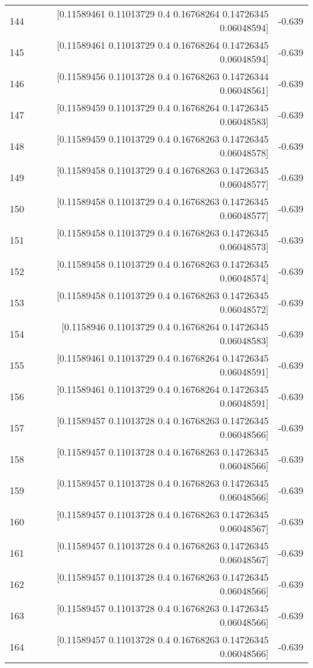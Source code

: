 \begin{longtable}{lrr}
144 & [0.11589461 0.11013729 0.4        0.16768264 0.14726345 0.06048594] & -0.639 \\
145 & [0.11589461 0.11013729 0.4        0.16768264 0.14726345 0.06048594] & -0.639 \\
146 & [0.11589456 0.11013728 0.4        0.16768263 0.14726344 0.06048561] & -0.639 \\
147 & [0.11589459 0.11013729 0.4        0.16768264 0.14726345 0.06048583] & -0.639 \\
148 & [0.11589459 0.11013729 0.4        0.16768263 0.14726345 0.06048578] & -0.639 \\
149 & [0.11589458 0.11013729 0.4        0.16768263 0.14726345 0.06048577] & -0.639 \\
150 & [0.11589458 0.11013729 0.4        0.16768263 0.14726345 0.06048577] & -0.639 \\
151 & [0.11589458 0.11013729 0.4        0.16768263 0.14726345 0.06048573] & -0.639 \\
152 & [0.11589458 0.11013729 0.4        0.16768263 0.14726345 0.06048574] & -0.639 \\
153 & [0.11589458 0.11013729 0.4        0.16768263 0.14726345 0.06048572] & -0.639 \\
154 & [0.1158946  0.11013729 0.4        0.16768264 0.14726345 0.06048583] & -0.639 \\
155 & [0.11589461 0.11013729 0.4        0.16768264 0.14726345 0.06048591] & -0.639 \\
156 & [0.11589461 0.11013729 0.4        0.16768264 0.14726345 0.06048591] & -0.639 \\
157 & [0.11589457 0.11013728 0.4        0.16768263 0.14726345 0.06048566] & -0.639 \\
158 & [0.11589457 0.11013728 0.4        0.16768263 0.14726345 0.06048566] & -0.639 \\
159 & [0.11589457 0.11013728 0.4        0.16768263 0.14726345 0.06048566] & -0.639 \\
160 & [0.11589457 0.11013728 0.4        0.16768263 0.14726345 0.06048567] & -0.639 \\
161 & [0.11589457 0.11013728 0.4        0.16768263 0.14726345 0.06048567] & -0.639 \\
162 & [0.11589457 0.11013728 0.4        0.16768263 0.14726345 0.06048566] & -0.639 \\
163 & [0.11589457 0.11013728 0.4        0.16768263 0.14726345 0.06048566] & -0.639 \\
164 & [0.11589457 0.11013728 0.4        0.16768263 0.14726345 0.06048566] & -0.639 \\

\end{longtable}
